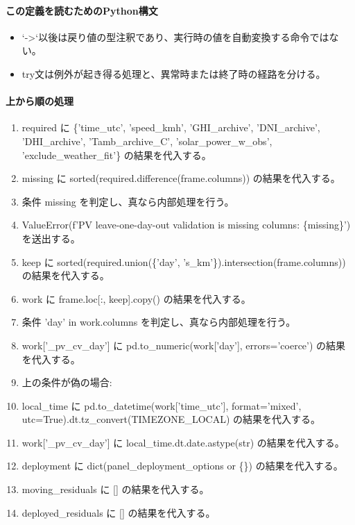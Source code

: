 \documentclass[a4paper,11pt]{article}
\begin{document}
            \paragraph{この定義を読むためのPython構文}
            \begin{itemize}[leftmargin=1.6em]
            \item `->`以後は戻り値の型注釈であり、実行時の値を自動変換する命令ではない。
\item try文は例外が起き得る処理と、異常時または終了時の経路を分ける。
            \end{itemize}
            \paragraph{上から順の処理}
            \begin{enumerate}[leftmargin=1.8em]
            \item required に \{'time\_utc', 'speed\_kmh', 'GHI\_archive', 'DNI\_archive', 'DHI\_archive', 'Tamb\_archive\_C', 'solar\_power\_w\_obs', 'exclude\_weather\_fit'\} の結果を代入する。
\item missing に sorted(required.difference(frame.columns)) の結果を代入する。
\item 条件 missing を判定し、真なら内部処理を行う。
\item   ValueError(f'PV leave-one-day-out validation is missing columns: \{missing\}') を送出する。
\item keep に sorted(required.union(\{'day', 's\_km'\}).intersection(frame.columns)) の結果を代入する。
\item work に frame.loc[:, keep].copy() の結果を代入する。
\item 条件 'day' in work.columns を判定し、真なら内部処理を行う。
\item   work['\_pv\_cv\_day'] に pd.to\_numeric(work['day'], errors='coerce') の結果を代入する。
\item   上の条件が偽の場合:
\item   local\_time に pd.to\_datetime(work['time\_utc'], format='mixed', utc=True).dt.tz\_convert(TIMEZONE\_LOCAL) の結果を代入する。
\item   work['\_pv\_cv\_day'] に local\_time.dt.date.astype(str) の結果を代入する。
\item deployment に dict(panel\_deployment\_options or \{\}) の結果を代入する。
\item moving\_residuals に [] の結果を代入する。
\item deployed\_residuals に [] の結果を代入する。

\end{enumerate}
\end{document}
